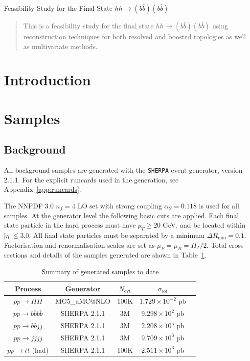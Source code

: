\documentclass[12pt]{article}
\newcommand\pubnumber{DRAFT-001}
\newcommand\pubdate{\today}
\def\Title#1{\begin{center} {\Large #1 } \end{center}}
\def\Author#1{\begin{center}{ \sc #1} \end{center}}
\def\Address#1{\begin{center}{ \it #1} \end{center}}
\newcommand\pubblock{\rightline{\begin{tabular}{l} \pubnumber\\
         \pubdate  \end{tabular}}}
\newenvironment{Abstract}{\begin{quotation}  }{\end{quotation}}
\begin{document}
\begin{titlepage}
\hspace{-1.4cm}\pubblock

\vfill
\Title{Feasibility Study for the Final State $hh\rightarrow (b\bar{b})(b\bar{b})$}
\vfill
\Author{}
\Address{}
\vfill
\begin{Abstract}
This is a feasibility study for the final state $hh\rightarrow (b\bar{b})(b\bar{b})$ using reconstruction techniques for both resolved
and boosted topologies as well as multivariate methods.
\end{Abstract}
\vfill
\end{titlepage}
\def\thefootnote{\fnsymbol{footnote}}
\setcounter{footnote}{0}
%

\section{Introduction}


\section{Samples}
\label{sec:samples}
\subsection{Background}
All background samples are generated with the {\tt SHERPA} event generator, version 2.1.1. For the explicit runcards used in the generation, see Appendix~\ref{app:runcards}.

The NNPDF 3.0 $n_f = 4$ LO set with strong coupling $\alpha_S=0.118$ is used for all samples. At the generator level the following basic cuts are applied. Each final state particle in the hard process must have $p_T \ge 20$ GeV, and be located within $| \eta | \le 3.0$. All final state particles must be separated by a minimum $\Delta R_{\mathrm{min}} =0.1$. Factorisation and renormalisation scales are set as $\mu_F=\mu_R=H_T/2$. Total cross-sections and details of the samples generated are shown in Table~\ref{tab:samples}. 


\begin{table}[h]
\begin{center}
\begin{tabular}{|c|c|c|c|c|}
\hline
Process &  Generator & $N_{\mathrm{evt}}$ & $\sigma_{\mathrm{tot}}$ \\
\hline
\hline
$pp \to HH$ &  MG5\_aMC@NLO & 100K & $1.729\times10^{-2}$ pb \\
\hline
$pp \to b\bar{b}b\bar{b}$ &  SHERPA 2.1.1 & 3M &$9.298 \times10^2$ pb \\
$pp \to b\bar{b}jj$ &  SHERPA 2.1.1 & 3M & $2.208 \times 10^5$ pb\\
$pp \to jjjj$ &  SHERPA 2.1.1 & 3M  & $9.709\times 10^6$ pb \\
$pp \to t\bar{t}$ (had) &  SHERPA 2.1.1 & 100K & $2.511\times 10^3$ pb \\
\hline
\end{tabular}
\caption{Summary of generated samples to date} \label{tab:samples}
\end{center}
\end{table}%
\end{document}
